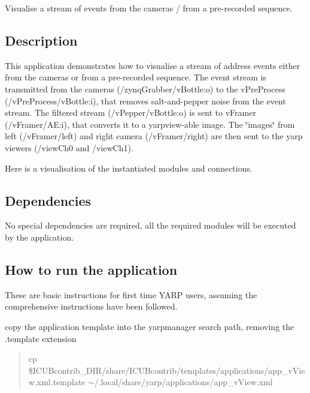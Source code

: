 Visualise a stream of events from the cameras / from a pre-\/recorded sequence.

\subsection*{Description}

This application demonstrates how to visualise a stream of address events either from the cameras or from a pre-\/recorded sequence. The event stream is transmitted from the cameras (/zynq\+Grabber/v\+Bottle\+:o) to the v\+Pre\+Process (/v\+Pre\+Process/v\+Bottle\+:i), that removes salt-\/and-\/pepper noise from the event stream. The filtered stream (/v\+Pepper/v\+Bottle\+:o) is sent to v\+Framer (/v\+Framer/\+AE\+:i), that converts it to a yarpview-\/able image. The \char`\"{}images\char`\"{} from left (/v\+Framer/left) and right camera (/v\+Framer/right) are then sent to the yarp viewers (/view\+Ch0 and /view\+Ch1).

Here is a visualisation of the instantiated modules and connections.



\subsection*{Dependencies}

No special dependencies are required, all the required modules will be executed by the application.

\subsection*{How to run the application}

These are basic instructions for first time Y\+A\+RP users, assuming the comprehensive instructions have been followed.


\begin{DoxyItemize}
\item copy the application template into the yarpmanager search path, removing the .template extension
\end{DoxyItemize}

\begin{quote}
cp \$\+I\+C\+U\+Bcontrib\+\_\+\+D\+IR/share/\+I\+C\+U\+Bcontrib/templates/applications/app\+\_\+v\+View.xml.\+template $\sim$/.local/share/yarp/applications/app\+\_\+v\+View.\+xml \end{quote}



